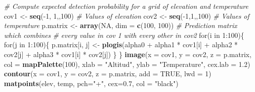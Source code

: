 \documentclass[]{book}
\newenvironment{Shaded}{\begin{snugshade}}{\end{snugshade}}
\newcommand{\KeywordTok}[1]{\textcolor[rgb]{0.13,0.29,0.53}{\textbf{{#1}}}}
\newcommand{\DataTypeTok}[1]{\textcolor[rgb]{0.13,0.29,0.53}{{#1}}}
\newcommand{\DecValTok}[1]{\textcolor[rgb]{0.00,0.00,0.81}{{#1}}}
\newcommand{\FloatTok}[1]{\textcolor[rgb]{0.00,0.00,0.81}{{#1}}}
\newcommand{\StringTok}[1]{\textcolor[rgb]{0.31,0.60,0.02}{{#1}}}
\newcommand{\CommentTok}[1]{\textcolor[rgb]{0.56,0.35,0.01}{\textit{{#1}}}}
\newcommand{\OtherTok}[1]{\textcolor[rgb]{0.56,0.35,0.01}{{#1}}}
\newcommand{\NormalTok}[1]{{#1}}
\begin{document}
\begin{Shaded}
\begin{Highlighting}[]
\CommentTok{# Compute expected detection probability for a grid of elevation and temperature}
\NormalTok{cov1 <-}\StringTok{ }\KeywordTok{seq}\NormalTok{(-}\DecValTok{1}\NormalTok{, }\DecValTok{1}\NormalTok{,,}\DecValTok{100}\NormalTok{)                  }\CommentTok{# Values of elevation}
\NormalTok{cov2 <-}\StringTok{ }\KeywordTok{seq}\NormalTok{(-}\DecValTok{1}\NormalTok{,}\DecValTok{1}\NormalTok{,,}\DecValTok{100}\NormalTok{)                   }\CommentTok{# Values of temperature}
\NormalTok{p.matrix <-}\StringTok{ }\KeywordTok{array}\NormalTok{(}\OtherTok{NA}\NormalTok{, }\DataTypeTok{dim =} \KeywordTok{c}\NormalTok{(}\DecValTok{100}\NormalTok{, }\DecValTok{100}\NormalTok{)) }\CommentTok{# Prediction matrix which combines }
\CommentTok{# every value in cov 1 with every other in cov2}
\NormalTok{for(i in }\DecValTok{1}\NormalTok{:}\DecValTok{100}\NormalTok{)\{}
   \NormalTok{for(j in }\DecValTok{1}\NormalTok{:}\DecValTok{100}\NormalTok{)\{}
      \NormalTok{p.matrix[i, j] <-}\StringTok{ }\KeywordTok{plogis}\NormalTok{(alpha0 +}\StringTok{ }\NormalTok{alpha1 *}\StringTok{ }\NormalTok{cov1[i] +}\StringTok{ }
\StringTok{                                 }\NormalTok{alpha2 *}\StringTok{ }\NormalTok{cov2[j] +}\StringTok{ }
\StringTok{                                 }\NormalTok{alpha3 *}\StringTok{ }\NormalTok{cov1[i] *}\StringTok{ }\NormalTok{cov2[j])}
   \NormalTok{\}}
\NormalTok{\}}
\KeywordTok{image}\NormalTok{(}\DataTypeTok{x =} \NormalTok{cov1, }\DataTypeTok{y =} \NormalTok{cov2, }\DataTypeTok{z =} \NormalTok{p.matrix, }\DataTypeTok{col =} \KeywordTok{mapPalette}\NormalTok{(}\DecValTok{100}\NormalTok{), }\DataTypeTok{xlab =} \StringTok{"Altitud"}\NormalTok{, }
      \DataTypeTok{ylab =} \StringTok{"Temperature"}\NormalTok{, }\DataTypeTok{cex.lab =} \FloatTok{1.2}\NormalTok{)}
\KeywordTok{contour}\NormalTok{(}\DataTypeTok{x =} \NormalTok{cov1, }\DataTypeTok{y =} \NormalTok{cov2, }\DataTypeTok{z =} \NormalTok{p.matrix, }\DataTypeTok{add =} \OtherTok{TRUE}\NormalTok{, }\DataTypeTok{lwd =} \DecValTok{1}\NormalTok{)}
\KeywordTok{matpoints}\NormalTok{(elev, temp, }\DataTypeTok{pch=}\StringTok{"+"}\NormalTok{, }\DataTypeTok{cex=}\FloatTok{0.7}\NormalTok{, }\DataTypeTok{col =} \StringTok{"black"}\NormalTok{)}
\end{Highlighting}
\end{Shaded}
\end{document}

